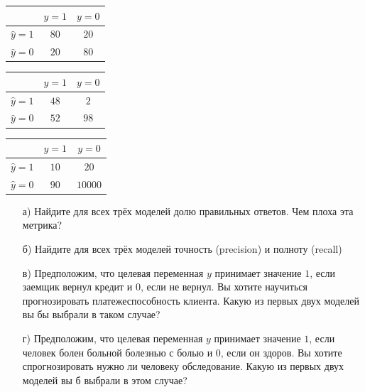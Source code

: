 \documentclass[12pt, a4paper, oneside]{article}
\begin{document}
\begin{minipage}[t]{0.33\textwidth}
	\begin{tabular}{|c|c|c|}
		\hline
		& $y=1$  &  $ y = 0$ \\  \hline 
		$\hat y = 1$  &   $80$ &    $20$ \\      \hline 
		$\hat y = 0$ &   $20$ &     $80$ \\      \hline 
	\end{tabular}
\end{minipage}
\begin{minipage}[t]{0.33\textwidth}
	\begin{tabular}{|c|c|c|}
		\hline
		& $y=1$  &  $ y = 0$ \\  \hline 
		$\hat y = 1$  &   $48$ &    $2$ \\      \hline 
		$\hat y = 0$ &   $52$ &     $98$ \\      \hline 
	\end{tabular}
\end{minipage}
\begin{minipage}[t]{0.33\textwidth}
	\begin{tabular}{|c|c|c|}
		\hline
		& $y=1$  &  $ y = 0$ \\  \hline 
		$\hat y = 1$  &   $10$ &    $20$ \\         \hline 
		$\hat y = 0$ &   $90$ &    $10000$ \\   \hline 
	\end{tabular}
\end{minipage}

\begin{enumerate}
	\item[а)]   Найдите для всех трёх моделей долю правильных ответов. Чем плоха эта метрика? 
	\item[б)]   Найдите для всех трёх моделей точность (precision) и полноту (recall)
	\item[в)]   Предположим, что целевая переменная $y$ принимает значение $1$, если заемщик вернул кредит  и $0$, если не вернул. Вы хотите научиться прогнозировать платежеспособность клиента. Какую из первых двух моделей вы бы выбрали в таком случае? 
	\item[г)]  Предположим, что целевая переменная $y$ принимает значение $1$, если человек болен больной болезнью с болью и $0$, если он здоров. Вы хотите спрогнозировать нужно ли человеку обследование. Какую из первых двух моделей вы б выбрали в этом случае? 
\end{enumerate}
\end{document}
